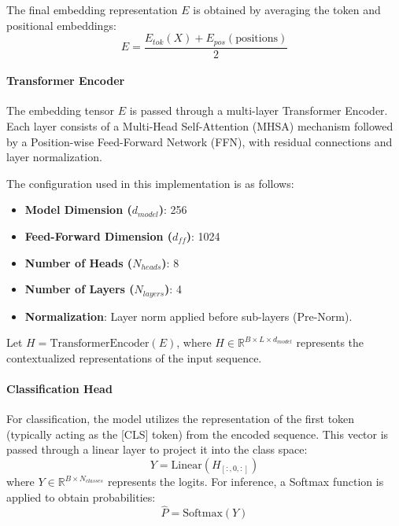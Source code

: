 \documentclass{ieeeaccess}
\begin{document}
The final embedding representation $E$ is obtained by averaging the token and positional embeddings:
\begin{equation}
    E = \frac{E_{tok}(X) + E_{pos}(\text{positions})}{2}
\end{equation}

\paragraph{Transformer Encoder}
The embedding tensor $E$ is passed through a multi-layer Transformer Encoder. Each layer consists of a Multi-Head Self-Attention (MHSA) mechanism followed by a Position-wise Feed-Forward Network (FFN), with residual connections and layer normalization. 

The configuration used in this implementation is as follows:
\begin{itemize}
    \item \textbf{Model Dimension ($d_{model}$)}: 256
    \item \textbf{Feed-Forward Dimension ($d_{ff}$)}: 1024
    \item \textbf{Number of Heads ($N_{heads}$)}: 8
    \item \textbf{Number of Layers ($N_{layers}$)}: 4
    \item \textbf{Normalization}: Layer norm applied before sub-layers (Pre-Norm).
\end{itemize}

Let $H = \text{TransformerEncoder}(E)$, where $H \in \mathbb{R}^{B \times L \times d_{model}}$ represents the contextualized representations of the input sequence.

\paragraph{Classification Head}
For classification, the model utilizes the representation of the first token (typically acting as the [CLS] token) from the encoded sequence. This vector is passed through a linear layer to project it into the class space:
\begin{equation}
    Y = \text{Linear}(H_{[:, 0, :]})
\end{equation}
where $Y \in \mathbb{R}^{B \times N_{classes}}$ represents the logits. For inference, a Softmax function is applied to obtain probabilities:
\begin{equation}
    \hat{P} = \text{Softmax}(Y)
\end{equation}
\end{document}
